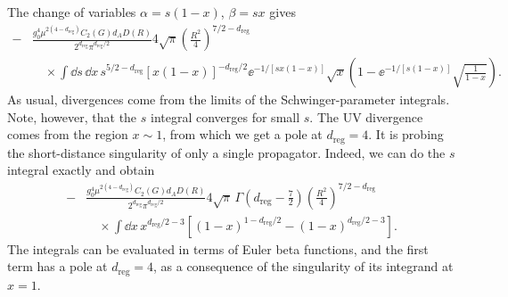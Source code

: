 The change of variables $\alpha=s(1-x)$, $\beta=sx$ gives
\begin{equation}
\begin{aligned}
-&\frac{g_0^4\mu^{2(4-d_{\mathrm{reg}})}C_2(G)d_AD(R)}{2^{d_{\mathrm{reg}}}\pi^{d_{\mathrm{reg}}/2}}
 4\sqrt\pi\left(\frac{R^2}{4}\right)^{7/2-d_{\mathrm{reg}}}\\[-2pt]
&\quad\times\int\dd s\,\dd x\,s^{5/2-d_{\mathrm{reg}}}[x(1-x)]^{-d_{\mathrm{reg}}/2}
 \ee^{-1/[sx(1-x)]}\sqrt{x}
 \left(1-\ee^{-1/[s(1-x)]}\sqrt{\frac{1}{1-x}}\right).
\end{aligned}
\label{eq:9.4}
\end{equation}
As usual, divergences come from the limits of the Schwinger-parameter
integrals. Note, however, that the $s$ integral converges for small $s$. The
UV divergence comes from the region $x\sim1$, from which we get a pole at
$d_{\mathrm{reg}}=4$. It is probing the short-distance singularity of only a single
propagator. Indeed, we can do the $s$ integral exactly and obtain
\begin{equation}
\begin{aligned}
-&\frac{g_0^4\mu^{2(4-d_{\mathrm{reg}})}C_2(G)d_AD(R)}{2^{d_{\mathrm{reg}}}\pi^{d_{\mathrm{reg}}/2}}
 4\sqrt\pi\,\Gamma\!\left(d_{\mathrm{reg}}-\frac72\right)
 \left(\frac{R^2}{4}\right)^{7/2-d_{\mathrm{reg}}}\\[-2pt]
&\quad\times\int\dd x\,x^{d_{\mathrm{reg}}/2-3}
 \left[(1-x)^{1-d_{\mathrm{reg}}/2}-(1-x)^{d_{\mathrm{reg}}/2-3}\right].
\end{aligned}
\label{eq:9.5}
\end{equation}
The integrals can be evaluated in terms of Euler beta functions, and the first
term has a pole at $d_{\mathrm{reg}}=4$, as a consequence of the singularity of its integrand
at $x=1$.

